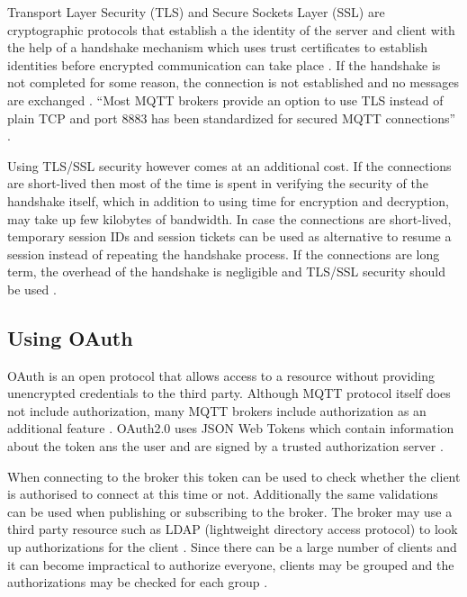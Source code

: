Transport Layer Security (TLS) and Secure Sockets Layer (SSL) are
cryptographic protocols that establish a the identity of the server
and client with the help of a handshake mechanism which uses trust
certificates to establish identities before encrypted communication
can take place \cite{ibm-mqtt-security}. If the handshake is not
completed for some reason, the connection is not established and no
messages are exchanged \cite{mqtt-sec-ssl}. ``Most MQTT brokers
provide an option to use TLS instead of plain TCP and port 8883 has
been standardized for secured MQTT connections''
\cite{iot-design-mqtt-security}.

Using TLS/SSL security however comes at an additional cost. If the
connections are short-lived then most of the time is spent in
verifying the security of the handshake itself, which in addition to
using time for encryption and decryption, may take up few
kilobytes of bandwidth. In case the connections are short-lived,
temporary session IDs and session tickets can be used as alternative to resume a
session instead of repeating the handshake process. If the connections
are long term, the overhead of the handshake is negligible and TLS/SSL
security should be used
\cite{iot-design-mqtt-security,mqtt-sec-ssl}.

\subsection{Using OAuth}

OAuth is an open protocol that allows access to a resource without
providing unencrypted credentials to the third party. Although MQTT
protocol itself does not include authorization, many MQTT brokers
include authorization as an additional feature
\cite{ibm-mqtt-security}. OAuth2.0 uses JSON Web Tokens which contain
information about the token ans the user and are signed by a trusted
authorization server \cite{hivemq-security-oauth}.

When connecting to the broker this token can be used to check whether
the client is authorised to connect at this time or not. Additionally
the same validations can be used when publishing or subscribing to the
broker. The broker may use a third party resource such as LDAP
(lightweight directory access protocol) to look up authorizations for
the client \cite{hivemq-security-oauth}. Since there can be a large
number of clients and it can become impractical to authorize everyone,
clients may be grouped and the authorizations may be checked for each
group \cite{ibm-mqtt-security}.
  
